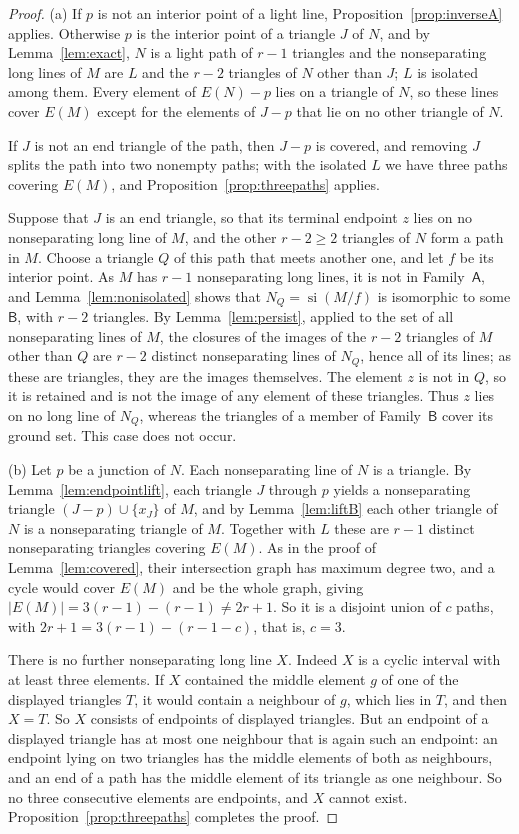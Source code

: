 \documentclass[11pt]{amsart}
\theoremstyle{definition}
\theoremstyle{remark}
\numberwithin{equation}{section}
\newcommand{\si}{\operatorname{si}}
\newcommand{\FA}{\mathsf{A}}
\newcommand{\FB}{\mathsf{B}}
\begin{document}
\begin{proof}
(a) If $p$ is not an interior point of a light line, Proposition~\ref{prop:inverseA} applies. Otherwise $p$ is the interior point of a triangle $J$ of $N$, and by Lemma~\ref{lem:exact}, $N$ is a light path of $r-1$ triangles and the nonseparating long lines of $M$ are $L$ and the $r-2$ triangles of $N$ other than $J$; $L$ is isolated among them. Every element of $E(N)-p$ lies on a triangle of $N$, so these lines cover $E(M)$ except for the elements of $J-p$ that lie on no other triangle of $N$.

If $J$ is not an end triangle of the path, then $J-p$ is covered, and removing $J$ splits the path into two nonempty paths; with the isolated $L$ we have three paths covering $E(M)$, and Proposition~\ref{prop:threepaths} applies.

Suppose that $J$ is an end triangle, so that its terminal endpoint $z$ lies on no nonseparating long line of $M$, and the other $r-2\ge2$ triangles of $N$ form a path in $M$. Choose a triangle $Q$ of this path that meets another one, and let $f$ be its interior point. As $M$ has $r-1$ nonseparating long lines, it is not in Family~$\FA$, and Lemma~\ref{lem:nonisolated} shows that $N_Q=\si(M/f)$ is isomorphic to some $\FB$, with $r-2$ triangles. By Lemma~\ref{lem:persist}, applied to the set of all nonseparating lines of $M$, the closures of the images of the $r-2$ triangles of $M$ other than $Q$ are $r-2$ distinct nonseparating lines of $N_Q$, hence all of its lines; as these are triangles, they are the images themselves. The element $z$ is not in $Q$, so it is retained and is not the image of any element of these triangles. Thus $z$ lies on no long line of $N_Q$, whereas the triangles of a member of Family~$\FB$ cover its ground set. This case does not occur.

(b) Let $p$ be a junction of $N$. Each nonseparating line of $N$ is a triangle. By Lemma~\ref{lem:endpointlift}, each triangle $J$ through $p$ yields a nonseparating triangle $(J-p)\cup\{x_J\}$ of $M$, and by Lemma~\ref{lem:liftB} each other triangle of $N$ is a nonseparating triangle of $M$. Together with $L$ these are $r-1$ distinct nonseparating triangles covering $E(M)$. As in the proof of Lemma~\ref{lem:covered}, their intersection graph has maximum degree two, and a cycle would cover $E(M)$ and be the whole graph, giving $|E(M)|=3(r-1)-(r-1)\ne 2r+1$. So it is a disjoint union of $c$ paths, with $2r+1=3(r-1)-(r-1-c)$, that is, $c=3$.

There is no further nonseparating long line $X$. Indeed $X$ is a cyclic interval with at least three elements. If $X$ contained the middle element $g$ of one of the displayed triangles $T$, it would contain a neighbour of $g$, which lies in $T$, and then $X=T$. So $X$ consists of endpoints of displayed triangles. But an endpoint of a displayed triangle has at most one neighbour that is again such an endpoint: an endpoint lying on two triangles has the middle elements of both as neighbours, and an end of a path has the middle element of its triangle as one neighbour. So no three consecutive elements are endpoints, and $X$ cannot exist. Proposition~\ref{prop:threepaths} completes the proof.
\end{proof}
\end{document}
